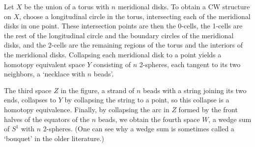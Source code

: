 \begin{example}
\label{ex:torus-meridional-disks-necklace}
Let $X$ be the union of a torus with $n$ meridional disks. To obtain a CW structure
on $X$, choose a longitudinal circle in the torus, intersecting each of the meridional
disks in one point. These intersection points are then the 0-cells, the 1-cells are the
rest of the longitudinal circle and the boundary circles of the meridional disks, and
the 2-cells are the remaining regions of the torus and the interiors of the meridional
disks. Collapsing each meridional disk to a point yields a homotopy equivalent space
$Y$ consisting of $n$ 2-spheres, each tangent to its two neighbors, a `necklace with $n$
beads'.



The third space $Z$ in the figure, a strand of $n$ beads with a string joining its two
ends, collapses to $Y$ by collapsing the string to a point, so this collapse is a homotopy
equivalence. Finally, by collapsing the arc in $Z$ formed by the front halves of the
equators of the $n$ beads, we obtain the fourth space $W$, a wedge sum of $S^1$ with $n$
2-spheres. (One can see why a wedge sum is sometimes called a `bouquet' in the older
literature.)
\end{example}
